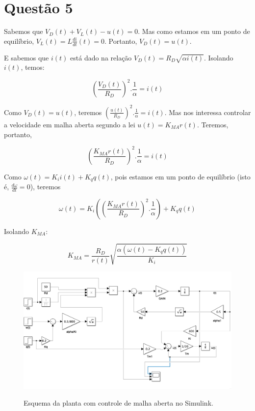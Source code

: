 \documentclass[11pt]{article}
\begin{document}
\section{Questão 5}

Sabemos que $V_{D}(t) + V_{L}(t) - u(t) = 0$. Mas como estamos em um ponto de equilíbrio,
$V_{L}(t) = L\frac{di}{dt}(t) = 0$. Portanto, $V_{D}(t) = u(t)$.

E sabemos que $i(t)$ está dado na relação $V_{D}(t) = R_{D}\sqrt{\alpha i(t)}$. Isolando $i(t)$, temos:

\begin{equation}
	(\frac{V_{D}(t)}{R_{D}})^2 . \frac{1}{\alpha} =  i(t)
\end{equation}

Como $V_{D}(t) = u(t)$, teremos $(\frac{u(t)}{R_{D}})^2 . \frac{1}{\alpha} =  i(t)$. Mas nos interessa controlar
a velocidade em malha aberta segundo a lei $u(t) = K_{MA}r(t)$. Teremos, portanto,

\begin{equation}
	(\frac{K_{MA}r(t)}{R_{D}})^2 . \frac{1}{\alpha} =  i(t)
\end{equation}

Como $\omega(t) = K_{i}i(t) + K_{q}q(t)$, pois estamos em um ponto de equilíbrio (isto é, $\frac{d\omega}{dt} = 0$),
teremos

\begin{equation}
	\omega(t) = K_{i}((\frac{K_{MA}r(t)}{R_{D}})^2 . \frac{1}{\alpha}) +  K_{q}q(t)
\end{equation}

Isolando $K_{MA}$:

\begin{equation}
	K_{MA} = \frac{R_{D}}{r(t)}\sqrt{\frac{\alpha(\omega(t) -  K_{q}q(t))}{K_{i}}}
\end{equation}

\begin{figure}[H]
	\centering
	{\includegraphics[width=\textwidth]
		{assets/q5.jpg}}
	\caption{Esquema da planta com controle de malha aberta no Simulink.}
\end{figure}
\end{document}
